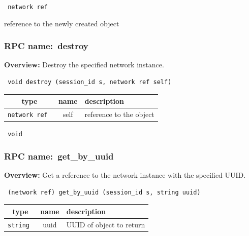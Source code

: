 \vspace{0.3cm}

{\tt 
network ref
}


reference to the newly created object
\vspace{0.3cm}
\vspace{0.3cm}
\vspace{0.3cm}
\subsubsection{RPC name:~destroy}

{\bf Overview:} 
Destroy the specified network instance.

\begin{verbatim} void destroy (session_id s, network ref self)\end{verbatim}



 
\vspace{0.3cm}
\begin{tabular}{|c|c|p{7cm}|}
 \hline
{\bf type} & {\bf name} & {\bf description} \\ \hline
{\tt network ref } & self & reference to the object \\ \hline 

\end{tabular}

\vspace{0.3cm}

{\tt 
void
}



\vspace{0.3cm}
\vspace{0.3cm}
\vspace{0.3cm}
\subsubsection{RPC name:~get\_by\_uuid}

{\bf Overview:} 
Get a reference to the network instance with the specified UUID.

\begin{verbatim} (network ref) get_by_uuid (session_id s, string uuid)\end{verbatim}



 
\vspace{0.3cm}
\begin{tabular}{|c|c|p{7cm}|}
 \hline
{\bf type} & {\bf name} & {\bf description} \\ \hline
{\tt string } & uuid & UUID of object to return \\ \hline 

\end{tabular}

